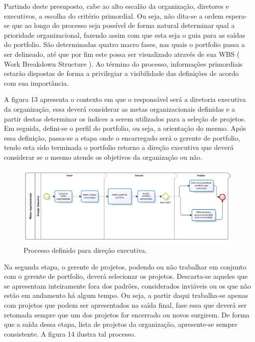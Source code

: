 \documentclass[12pt,a4paper,ruledheader,tocpage=prefix,floatnumber=continuous,pagestart=folhaderosto,font=times]{abnt}
\begin{document}
Partindo deste presuposto, cabe ao alto escalão da organização, diretores e executivos, a escolha do critério primordial. Ou seja, não dita-se a ordem 
espera-se que ao longo do processo seja possível de forma natural determinar qual a prioridade organizacional, fazendo assim com que esta seja o guia para 
as saídas do portfolio. São determinadas quatro macro fases, nas quais o portfolio passa a ser delineado, até que por fim este possa ser visualizado através 
de sua WBS ( Work Breakdown Structure ). Ao término do processo, informações primordiais estarão dispostas de forma a privilegiar a visibilidade das 
definições de acordo com sua importância.

A figura 13 apresenta o contexto em que o responsável será a diretoria executiva da organização, essa deverá considerar as metas organizacionais 
definidas e a partir destas determinar os índices a serem utilizados para a seleção de projetos. Em seguida, defini-se o perfil do portfolio, ou seja, a 
orientação do mesmo. Após essa definição, passa-se a etapa onde o encarregado será o gerente de portfolio, tendo esta sido terminada o portfolio retorno 
a direção executiva que deverá considerar se o mesmo atende os objetivos da organização ou não.

\begin{figure}[H]
\centering
\includegraphics[width=.9\textwidth]{DirecaoExecutiva.png}
\caption{Processo definido para direção executiva.}
\end{figure}

Na segunda etapa, o gerente de projetos, podendo ou não trabalhar em conjunto com o gerente de portfolio, deverá selecionar os projetos. Descarta-se 
aqueles que se apresentam inteiramente fora dos padrões, considerados inviáveis ou os que não estão em andamento há algum tempo. Ou seja, a partir daqui 
trabalha-se apenas com projetos que podem ser apresentados na saída final, fase essa que deverá ser retomada sempre que um dos projetos for encerrado ou 
novos surgirem. De forma que a saída dessa etapa, lista de projetos da organização, apresente-se sempre consistente. A figura 14 ilustra tal 
processo.
\end{document}
